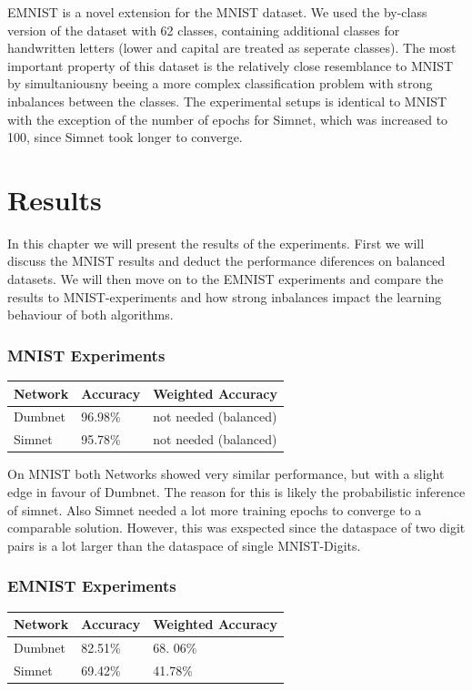 \documentclass[a4paper,pt12]{article}
\begin{document}
EMNIST is a novel extension for the MNIST dataset. We used the by-class version of the dataset with 62 classes, containing additional classes for handwritten letters (lower and capital are treated as seperate classes). The most important property of this dataset is the relatively close resemblance to MNIST by simultaniousny beeing a more complex classification problem with strong inbalances between the classes. \newline
The experimental setups is identical to MNIST with the exception of the number of epochs for Simnet, which was increased to 100, since Simnet took longer to converge.

\section{Results}
In this chapter we will present the results of the experiments. First we will discuss the MNIST results and deduct the performance diferences on balanced datasets. We will then move on to the EMNIST experiments and compare the results to MNIST-experiments and how strong inbalances impact the learning behaviour of both algorithms.

\subsubsection{MNIST Experiments}
\begin{center}
    \begin{tabular}{| l | l | l | }
    \hline
    Network & Accuracy & Weighted Accuracy \\ \hline
    Dumbnet & 96.98\% & not needed (balanced) \\ \hline
	Simnet & 95.78\% & not needed (balanced) \\ \hline
    \end{tabular}
\end{center}

On MNIST both Networks showed very similar performance, but with a slight edge in favour of Dumbnet. The reason for this is likely the probabilistic inference of simnet. Also Simnet needed a lot more training epochs to converge to a comparable solution. However, this was exspected since the dataspace of two digit pairs is a lot larger than the dataspace of single MNIST-Digits. 

\subsubsection{EMNIST Experiments}
\begin{center}
    \begin{tabular}{| l | l | l | }
    \hline
    Network & Accuracy & Weighted Accuracy \\ \hline
    Dumbnet & 82.51\% & 68.
    06\% \\ \hline
	Simnet & 69.42\% & 41.78\% \\ \hline
    \end{tabular}
\end{center}
\end{document}
